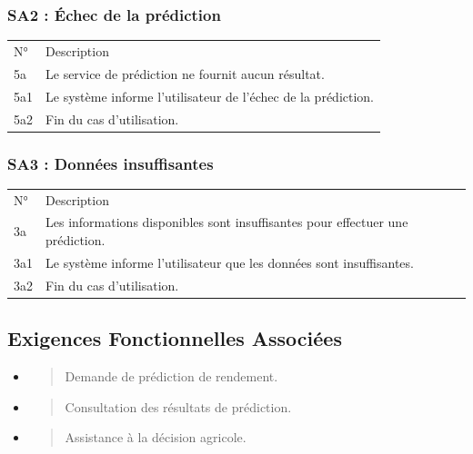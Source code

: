 \documentclass[
]{book}
\begin{document}
\hypertarget{sa2-uxe9chec-de-la-pruxe9diction}{%
\subsubsection{SA2 : Échec de la
prédiction}\label{sa2-uxe9chec-de-la-pruxe9diction}}

\begin{longtable}[]{@{}ll@{}}
\toprule
\endhead
N° & Description \\
5a & Le service de prédiction ne fournit aucun résultat. \\
5a1 & Le système informe l'utilisateur de l'échec de la prédiction. \\
5a2 & Fin du cas d'utilisation. \\
\bottomrule
\end{longtable}

\hypertarget{sa3-donnuxe9es-insuffisantes}{%
\subsubsection{SA3 : Données
insuffisantes}\label{sa3-donnuxe9es-insuffisantes}}

\begin{longtable}[]{@{}ll@{}}
\toprule
\endhead
N° & Description \\
3a & Les informations disponibles sont insuffisantes pour effectuer une
prédiction. \\
3a1 & Le système informe l'utilisateur que les données sont
insuffisantes. \\
3a2 & Fin du cas d'utilisation. \\
\bottomrule
\end{longtable}

\hypertarget{exigences-fonctionnelles-associuxe9es-3}{%
\subsection{Exigences Fonctionnelles
Associées}\label{exigences-fonctionnelles-associuxe9es-3}}

\begin{itemize}
\item
  \begin{quote}
  Demande de prédiction de rendement.
  \end{quote}
\item
  \begin{quote}
  Consultation des résultats de prédiction.
  \end{quote}
\item
  \begin{quote}
  Assistance à la décision agricole.
  \end{quote}
\end{itemize}
\end{document}
